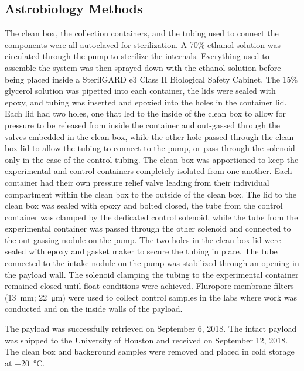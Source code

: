 \subsection{Astrobiology Methods}
\label{sec:Astrobiology Methods}
 The clean box, the collection containers, and the tubing used to connect the components were all autoclaved for sterilization. A 70\% ethanol solution was circulated through the pump to sterilize the internals. Everything used to assemble the system was then sprayed down with the ethanol solution before being placed inside a SterilGARD e3 Class II Biological Safety Cabinet. The 15\% glycerol solution was pipetted into each container, the lids were sealed with epoxy, and tubing was inserted and epoxied into the holes in the container lid. Each lid had two holes, one that led to the inside of the clean box to allow for pressure to be released from inside the container and out-gassed through the valves embedded in the clean box, while the other hole passed through the clean box lid to allow the tubing to connect to the pump, or pass through the solenoid only in the case of the control tubing. The clean box was apportioned to keep the experimental and control containers completely isolated from one another. Each container had their own pressure relief valve leading from their individual compartment within the clean box to the outside of the clean box. The lid to the clean box was sealed with epoxy and bolted closed, the tube from the control container was clamped by the dedicated control solenoid, while the tube from the experimental container was passed through the other solenoid and connected to the out-gassing nodule on the pump. The two holes in the clean box lid were sealed with epoxy and gasket maker to secure the tubing in place. The tube connected to the intake nodule on the pump was stabilized through an opening in the payload wall. The solenoid clamping the tubing to the experimental container remained closed until float conditions were achieved. Fluropore membrane filters (\SI{13}{\milli\meter}; \SI{22}{\micro\meter}) were used to collect control samples in the labs where work was conducted and on the inside walls of the payload. 
 
 The payload was successfully retrieved on September 6, 2018. The intact payload was shipped to the University of Houston and received on September 12, 2018. The clean box and background samples were removed and placed in cold storage at \SI{-20}{\celsius}.

